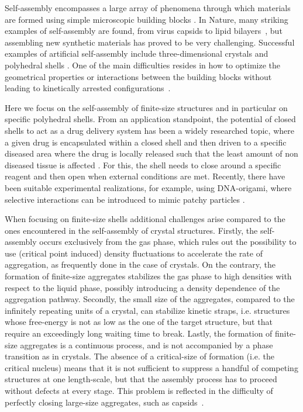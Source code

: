 \documentclass[a4paper, amsfonts, amssymb, amsmath, reprint, showkeys, nofootinbib, oneside]{revtex4-1}
\begin{document}
Self-assembly encompasses a large array of phenomena through which materials are formed using simple microscopic building blocks \cite{Whitelam2015}. In Nature, many striking examples of self-assembly are found, from virus capsids to lipid bilayers~\cite{Whitesides2002, Parnell2015, Teyssier2015}, but assembling new synthetic materials has proved to be very challenging. Successful examples of artificial self-assembly include three-dimensional crystals and polyhedral shells \cite{Dziomkina2005, Glotzer2007, Kim2011, LaCour2022,  McGorty2010, Mu2022, Nykypanchuk2008, Sacanna2011, Wang2012, Wang2015, Joshi2016,Bishop2022,Reguera2019, McMullen2022}. One of the main difficulties resides in how to optimize the geometrical properties or interactions between the building blocks without leading to kinetically arrested configurations~\cite{Frenkel2011, Lash2015, Blaaderen2006, Meulen2015}.

Here we focus on the self-assembly of finite-size structures and in particular on specific polyhedral shells. From an application standpoint, the potential of closed shells to act as a drug delivery system has been a widely researched topic, where a given drug is encapsulated within a closed shell and then driven to a specific diseased area where the drug is locally released such that the least amount of non diseased tissue is affected \cite{Huang2007, Uchida2007}. For this, the shell needs to close around a specific reagent and then open when external conditions are met. Recently, there have been suitable experimental realizations, for example, using DNA-origami, where selective interactions can be introduced to mimic patchy particles \cite{Mosayebi2017, Lee2022, Jun2021, Rothemund2006}.

When focusing on finite-size shells additional challenges arise compared to the ones encountered in the self-assembly of crystal structures. Firstly, the self-assembly occurs exclusively from the gas phase, which rules out the possibility to use (critical point induced) density fluctuations to accelerate the rate of aggregation, as frequently done in the case of crystals. On the contrary, the formation of finite-size aggregates stabilizes the gas phase to high densities with respect to the liquid phase, possibly introducing a density dependence of the aggregation pathway. Secondly, the small size of the aggregates, compared to the infinitely repeating units of a crystal, can stabilize kinetic straps, i.e. structures whose free-energy is not as low as the one of the target structure, but that require an exceedingly long waiting time to break. Lastly, the formation of finite-size aggregates is a continuous process, and is not accompanied by a phase transition as in crystals. The absence of a critical-size of formation (i.e. the critical nucleus) means that it is not sufficient to suppress a handful of competing structures at one length-scale, but that the assembly process has to proceed without defects at every stage. This problem is reflected in the difficulty of perfectly closing large-size aggregates, such as capsids~\cite{Mosayebi2017}.
\end{document}
